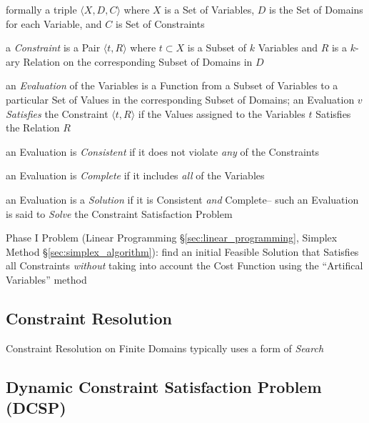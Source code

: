 formally a triple $\langle{X,D,C}\rangle$ where $X$ is a Set of Variables, $D$
is the Set of Domains for each Variable, and $C$ is Set of Constraints

a \emph{Constraint} is a Pair $\langle{t,R}\rangle$ where $t \subset X$ is a
Subset of $k$ Variables and $R$ is a $k$-ary Relation on the corresponding
Subset of Domains in $D$

an \emph{Evaluation} of the Variables is a Function from a Subset of Variables
to a particular Set of Values in the corresponding Subset of Domains; an
Evaluation $v$ \emph{Satisfies} the Constraint $\langle{t,R}\rangle$ if the
Values assigned to the Variables $t$ Satisfies the Relation $R$

an Evaluation is \emph{Consistent} if it does not violate \emph{any} of the
Constraints

an Evaluation is \emph{Complete} if it includes \emph{all} of the Variables

an Evaluation is a \emph{Solution} if it is Consistent \emph{and} Complete--
such an Evaluation is said to \emph{Solve} the Constraint Satisfaction Problem

\fist Phase I Problem (Linear Programming \S\ref{sec:linear_programming},
Simplex Method \S\ref{sec:simplex_algorithm}): find an initial Feasible
Solution that Satisfies all Constraints \emph{without} taking into account the
Cost Function using the ``Artifical Variables'' method



\subsection{Constraint Resolution}\label{sec:constraint_resolution}

Constraint Resolution on Finite Domains typically uses a form of \emph{Search}



\subsection{Dynamic Constraint Satisfaction Problem (DCSP)}\label{sec:dcsp}



